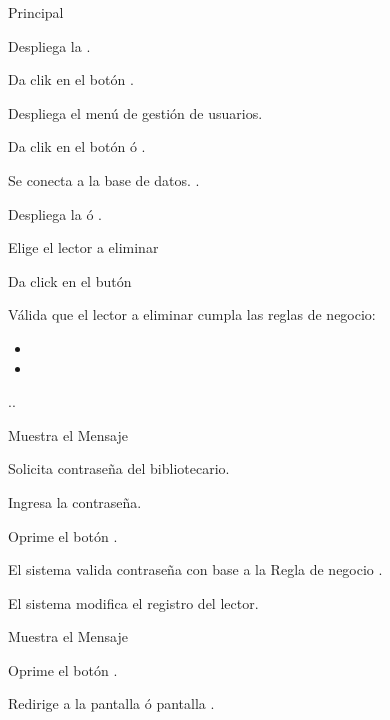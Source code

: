 	\begin{UCtrayectoria}{Principal}
	
		\UCpaso Despliega la .

		\UCpaso[\UCactor] Da clik en el botón .

		\UCpaso Despliega el menú de gestión de usuarios. 

		\UCpaso[\UCactor] Da clik en el botón  ó .\label{CU4.2ConectarBaseDatos}

		\UCpaso Se conecta a la base de datos. .

		\UCpaso Despliega la  ó .

		\UCpaso[\UCactor] Elige el lector a eliminar 

		\UCpaso[\UCactor] Da click en el butón \label{CU4.1EliminarLector}

		\UCpaso Válida que el lector a eliminar cumpla las reglas de negocio: 
				
			\begin{itemize}
				\item	{} 
				\item	{} 

			\end{itemize} 
		..


		\UCpaso Muestra el Mensaje \label{CU4.3Contrasena}

		\UCpaso Solicita contraseña del bibliotecario.

		\UCpaso[\UCactor] Ingresa la contraseña.

		\UCpaso[\UCactor] Oprime el botón .

		\UCpaso El sistema valida contraseña con base a la Regla de negocio  .

		\UCpaso El sistema modifica el registro del lector.

		\UCpaso Muestra el Mensaje 

		\UCpaso[\UCactor] Oprime el botón .

		\UCpaso Redirige a la pantalla  ó pantalla .		
	\end{UCtrayectoria}



